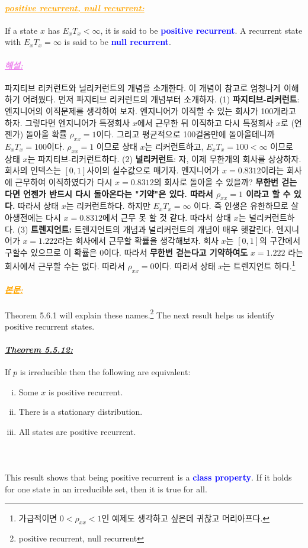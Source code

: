 \documentclass[12pt,oneside,english,a4paper]{article}
\def\bk{\paragraph{\LARGE$$}\LARGE}
\newcommand{\para}[1]{\paragraph{\LARGE\it\underline{\textbf{#1:}}}\LARGE}
\newcommand{\paraviolet}[1]{\paragraph{\LARGE\textcolor{violet}{\it\underline{\textbf{#1:}}}}\LARGE}
\newcommand{\paraorange}[1]{\paragraph{\LARGE\textcolor{orange}{\it\underline{\textbf{#1:}}}}\LARGE}
\begin{document}
\paraorange{positive recurrent, null recurrent}
If a state $x$ has $E_xT_x < \infty$, it is said to be \textcolor{blue}{\bf positive recurrent}. A recurrent state with $E_xT_x = \infty$ is said to be \textcolor{blue}{\bf null recurrent}. 

\paraviolet{해설} 파지티브 리커런트와 널리커런트의 개념을 소개한다. 이 개념이 참고로 엄청나게 이해하기 어려웠다. 먼저 파지티브 리커런트의 개념부터 소개하자. (1) {\bf 파지티브-리커런트}: 엔지니어의 이직문제를 생각하여 보자. 엔지니어가 이직할 수 있는 회사가 100개라고 하자. 그렇다면 엔지니어가 특정회사 $x$에서 근무한 뒤 이직하고 다시 특정회사 $x$로 (언젠가) 돌아올 확률 $\rho_{xx}=1$이다. 그리고 평균적으로 100걸음만에 돌아올테니까 $E_xT_x=100$이다. $\rho_{xx}=1$ 이므로 상태 $x$는 리커런트하고, $E_xT_x=100<\infty$ 이므로 상태 $x$는 파지티브-리커런트하다. (2) {\bf 널리커런트}: 자, 이제 무한개의 회사를 상상하자. 회사의 인덱스는 $[0,1]$사이의 실수값으로 매기자. 엔지니어가 $x=0.8312$이라는 회사에 근무하여 이직하였다가 다시 $x=0.8312$의 회사로 돌아올 수 있을까? {\bf 무한번 걷는다면 언젠가 반드시 다시 돌아온다는 "기약"은 있다. 따라서 $\rho_{xx}=1$ 이라고 할 수 있다.} 따라서 상태 $x$는 리커런트하다. 하지만 $E_xT_x=\infty$ 이다. 즉 인생은 유한하므로 살아생전에는 다시 $x=0.8312$에서 근무 못 할 것 같다. 따라서 상태 $x$는 널리커런트하다. (3) {\bf 트렌지언트:} 트렌지언트의 개념과 널리커런트의 개념이 매우 헷갈린다. 엔지니어가 $x=1.222$라는 회사에서 근무할 확률을 생각해보자. 회사 $x$는 $[0,1]$의 구간에서 구할수 있으므로 이 확률은 $0$이다. 따라서 {\bf 무한번 걷는다고 기약하여도} $x=1.222$ 라는 회사에서 근무할 수는 없다. 따라서 $\rho_{xx}=0$이다. 따라서 상태 $x$는 트렌지언트 하다.\footnote{가급적이면 $0<\rho_{xx}<1$인 예제도 생각하고 싶은데 귀찮고 머리아프다.}

\paraorange{본문}  Theorem 5.6.1 will explain these names.\footnote{positive recurrent, null recurrent} The next result helps us identify positive recurrent states.
\para{Theorem 5.5.12} If $p$ is irreducible then the following are equivalent:
\begin{enumerate}[(i)]
\item Some $x$ is positive recurrent.
\item There is a stationary distribution.
\item All states are positive recurrent.
\end{enumerate}
\bk This result shows that being positive recurrent is a \textcolor{blue}{\bf class property}. If it holds for one state in an irreducible set, then it is true for all.
\end{document}
